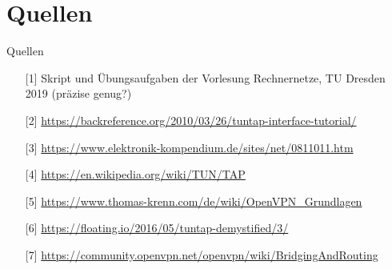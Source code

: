 \documentclass[ngerman,aspectratio=169]{beamer}
\begin{document}
	\section{Quellen}
	\begin{frame}{Quellen}
		\begin{enumerate}
			\item[{[1]}] Skript und Übungsaufgaben der Vorlesung Rechnernetze, TU Dresden 2019 (präzise genug?) \label{ref:rene}
			\item[{[2]}] \url{https://backreference.org/2010/03/26/tuntap-interface-tutorial/}
			\item[{[3]}] \url{https://www.elektronik-kompendium.de/sites/net/0811011.htm}
			\item[{[4]}] \url{https://en.wikipedia.org/wiki/TUN/TAP}
			\item[{[5]}] \url{https://www.thomas-krenn.com/de/wiki/OpenVPN_Grundlagen}
			\item[{[6]}] \url{https://floating.io/2016/05/tuntap-demystified/3/}
			\item [{[7]}] \url{https://community.openvpn.net/openvpn/wiki/BridgingAndRouting} \label{ref:openvpn}
		\end{enumerate}
\end{frame}
\end{document}
